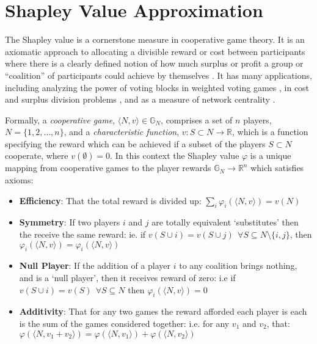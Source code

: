 \documentclass[]{interact}
\theoremstyle{plain}%
\theoremstyle{definition}
\theoremstyle{remark}
\begin{document}
\section{Shapley Value Approximation}\label{sec:shapley}

The Shapley value is a cornerstone measure in cooperative game theory. 
It is an axiomatic approach to allocating a divisible reward or cost between participants where there is a clearly defined notion of how much surplus or profit a group or ``coalition'' of participants could achieve by themselves \citep{ChalkiadakisEtAl2012}.
It has many applications, 
including analyzing the power of voting blocks in weighted voting games \citep{Bachrach2009ApproximatingPI}, 
in cost and surplus division problems  \citep{AzizEtal2016,archie_paper1}, 
and as a measure of network centrality \citep{Michalak:2013}.

Formally, a \textit{cooperative game}, $\langle N,v\rangle\in\mathbb{G}_N$, comprises a set of $n$ players, $N=\{1,2,\dots,n\}$, and a \textit{characteristic function}, $v:S\subset N\rightarrow \mathbb{R}$, which is a function specifying the reward which can be achieved if a subset of the players $S\subset N$ cooperate, where $v(\emptyset)=0$.
In this context the Shapley value $\varphi$ is a unique mapping from cooperative games to the player rewards $\mathbb{G}_N\rightarrow\mathbb{R}^n$ which satisfies axioms:

\begin{itemize}
\item	
\textbf{Efficiency}: That the total reward is divided up: $\sum_i\varphi_i(\langle N,v\rangle) = v(N)$
\item	
\textbf{Symmetry}: If two players $i$ and $j$ are totally equivalent `substitutes' then the receive the same reward: ie. if $v(S\cup i)=v(S\cup j)~~\forall S\subseteq N\setminus\{i,j\}$, then $\varphi_i(\langle N,v\rangle) = \varphi_i(\langle N,v\rangle)$
\item	
\textbf{Null Player}: If the addition of a player $i$ to any coalition brings nothing, and is a `null player', then it receives reward of zero: i.e if $v(S\cup i)=v(S)~~\forall S\subseteq N$ then $\varphi_i(\langle N,v\rangle)=0$
\item	
\textbf{Additivity}: That for any two games the reward afforded each player is each is the sum of the games considered together: i.e. for any $v_1$ and $v_2$, that: $\varphi(\langle N,v_1+v_2\rangle)=\varphi(\langle N,v_1 \rangle) + \varphi(\langle N,v_2\rangle)$
\end{itemize}
\end{document}
